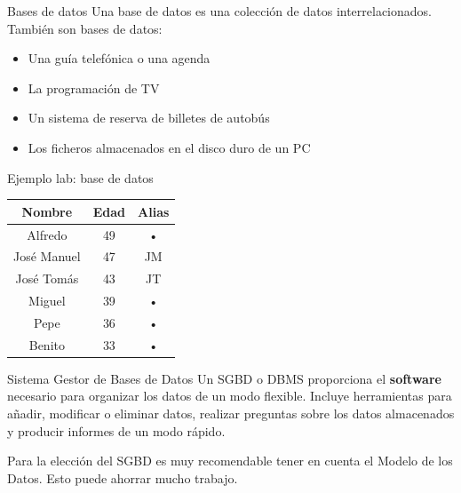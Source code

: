 \documentclass{classes/beamer_GeomaticaUA}
\begin{document}
\begin{frame}{Bases de datos}
Una base de datos es una colección de datos interrelacionados. También son bases de datos:
\begin{itemize}
\item Una guía telefónica o una agenda
\item La programación de TV
\item Un sistema de reserva de billetes de autobús
\item Los ficheros almacenados en el disco duro de un PC
\end{itemize}

\begin{exampleblock}{Ejemplo lab: base de datos}
\begin{center}
\begin{tabular}{|c|c|c|}
\hline 
\textbf{Nombre} & \textbf{Edad} & \textbf{Alias} \\ 
\hline 
Alfredo & 49 & • \\ 
\hline 
José Manuel & 47 & JM \\ 
\hline 
José Tomás & 43 & JT \\ 
\hline 
Miguel & 39 & • \\ 
\hline 
Pepe & 36 & • \\ 
\hline 
Benito & 33 & • \\ 
\hline 
\end{tabular} 
\end{center}
\end{exampleblock}

\end{frame}

\begin{frame}{Sistema Gestor de Bases de Datos}
Un SGBD o DBMS proporciona el \textbf{software} necesario para organizar los datos de un modo flexible. Incluye herramientas para añadir, modificar o eliminar datos, realizar preguntas sobre los datos almacenados y producir informes de un modo rápido.

Para la elección del SGBD es muy recomendable tener en cuenta el Modelo de los Datos. Esto puede ahorrar mucho trabajo.
\end{frame}
\end{document}
